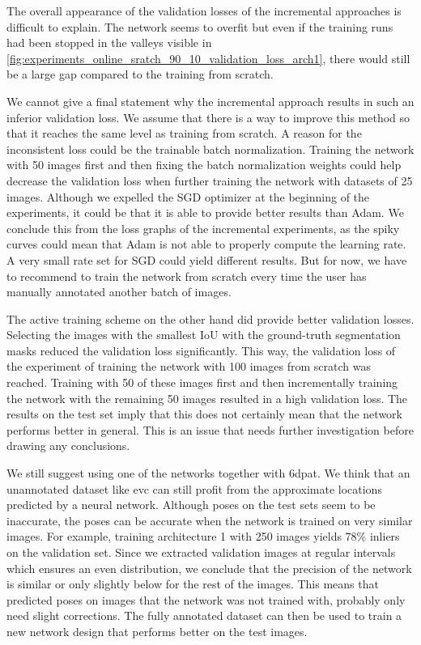 The overall appearance of the validation losses of the incremental approaches is difficult to explain. The network seems to overfit but even if the training runs had been stopped in the valleys visible in \fig \ref{fig:experiments_online_sratch_90_10_validation_loss_arch1}, there would still be a large gap compared to the training from scratch.

We cannot give a final statement why the incremental approach results in such an inferior validation loss. We assume that there is a way to improve this method so that it reaches the same level as training from scratch. A reason for the inconsistent loss could be the trainable batch normalization. Training the network with 50 images first and then fixing the batch normalization weights could help decrease the validation loss when further training the network with datasets of 25 images. Although we expelled the SGD optimizer at the beginning of the experiments, it could be that it is able to provide better results than Adam. We conclude this from the loss graphs of the incremental experiments, as the spiky curves could mean that Adam is not able to properly compute the learning rate. A very small rate set for SGD could yield different results. But for now, we have to recommend to train the network from scratch every time the user has manually annotated another batch of images.

The active training scheme on the other hand did provide better validation losses. Selecting the images with the smallest IoU with the ground-truth segmentation masks reduced the validation loss significantly. This way, the validation loss of the experiment of training the network with 100 images from scratch was reached. Training with 50 of these images first and then incrementally training the network with the remaining 50 images resulted in a high validation loss. The results on the test set imply that this does not certainly mean that the network performs better in general. This is an issue that needs further investigation before drawing any conclusions.

We still suggest using one of the networks together with \ac{6dpat}. We think that an unannotated dataset like \ac{evc} can still profit from the approximate locations predicted by a neural network. Although poses on the test sets seem to be inaccurate, the poses can be accurate when the network is trained on very similar images. For example, training architecture 1 with 250 images yields 78\% inliers on the validation set. Since we extracted validation images at regular intervals which ensures an even distribution, we conclude that the precision of the network is similar or only slightly below for the rest of the images. This means that predicted poses on images that the network was not trained with, probably only need slight corrections. The fully annotated dataset can then be used to train a new network design that performs better on the test images.